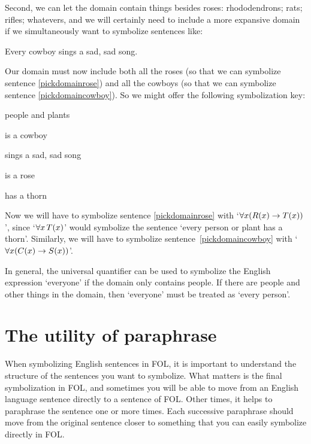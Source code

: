 Second, we can let the domain contain things besides roses: rhododendrons; rats; rifles; whatevers, and we will certainly need to include a more expansive domain if we simultaneously want to symbolize sentences like:
	\begin{earg}
		\item[\ex{pickdomaincowboy}] Every cowboy sings a sad, sad song.
	\end{earg}
Our domain must now include both all the roses (so that we can symbolize sentence \ref{pickdomainrose}) and all the cowboys (so that we can symbolize sentence \ref{pickdomaincowboy}). So we might offer the following symbolization key:
	\begin{ekey}
		\item[\text{domain}] people and plants
		\item[\atom{C}{x}]  is a cowboy
		\item[\atom{S}{x}]  sings a sad, sad song
		\item[\atom{R}{x}]  is a rose
		\item[\atom{T}{x}]  has a thorn
	\end{ekey}
Now we will have to symbolize sentence \ref{pickdomainrose} with `$\forall x (\mathord{R}(x) \rightarrow \mathord{T}(x))$', since `$\forall x\, \mathord{T}(x)$' would symbolize the sentence `every person or plant has a thorn'. Similarly, we will have to symbolize sentence~\ref{pickdomaincowboy} with `$\forall x (\mathord{C}(x) \rightarrow \mathord{S}(x))$'. 

In general, the universal quantifier can be used to symbolize the English expression `everyone' if the domain only contains people. If there are people and other things in the domain, then `everyone' must be treated as `every person'.


\section{The utility of paraphrase}
When symbolizing English sentences in FOL, it is important to understand the structure of the sentences you want to symbolize. What matters is the final symbolization in FOL, and sometimes you will be able to move from an English language sentence directly to a sentence of FOL. Other times, it helps to paraphrase the sentence one or more times. Each successive paraphrase should move from the original sentence closer to something that you can easily symbolize directly in FOL.

